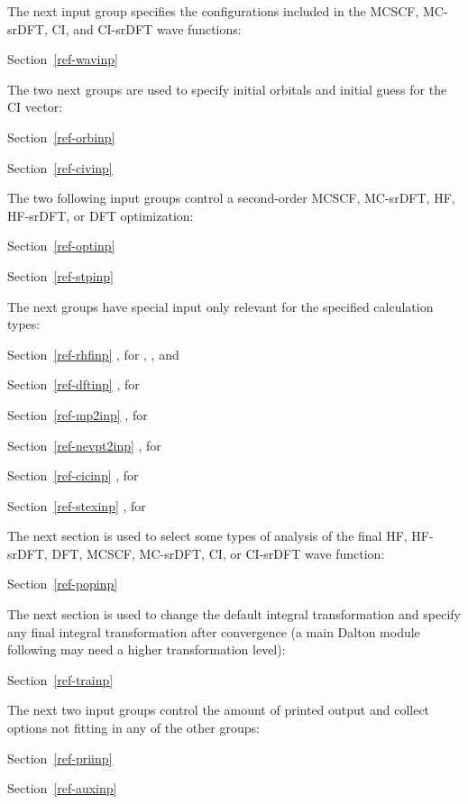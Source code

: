 \noindent
The next input group specifies the configurations included
in the MCSCF, MC-srDFT, CI, and CI-srDFT wave functions:

Section~\ref{ref-wavinp} 

\noindent
The two next groups are used to specify initial orbitals and initial
guess for the CI vector:

Section~\ref{ref-orbinp} 

Section~\ref{ref-civinp} 

\noindent
The two following input groups control a second-order MCSCF, MC-srDFT, HF, HF-srDFT, or DFT
optimization:

Section~\ref{ref-optinp} 

Section~\ref{ref-stpinp} 

\noindent
The next groups have special input only relevant for the
specified calculation types:

Section~\ref{ref-rhfinp} , for , , and 

Section~\ref{ref-dftinp} , for 

Section~\ref{ref-mp2inp} , for 

Section~\ref{ref-nevpt2inp} , for 

Section~\ref{ref-cicinp} , for 

Section~\ref{ref-stexinp} , for 

\noindent
The next section is used to select some types of analysis of the final
HF, HF-srDFT, DFT, MCSCF, MC-srDFT, CI, or CI-srDFT wave function:

Section~\ref{ref-popinp} 

\noindent
The next section is used to change the default integral transformation
and specify any final integral transformation after convergence (a
main Dalton module following {\sir} may need a higher transformation level):

Section~\ref{ref-trainp} 

\noindent
The next two input groups control the amount of printed output and
collect options not fitting in any of the other groups:

Section~\ref{ref-priinp} 

Section~\ref{ref-auxinp} 

